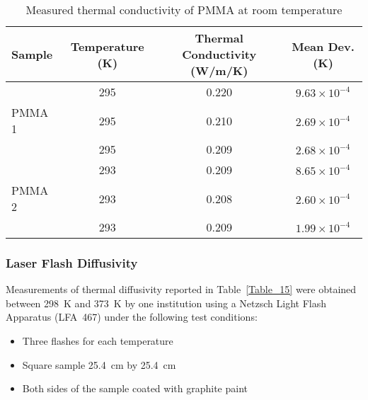 \documentclass{book}
\begin{document}
\begin{table}[ht]
\caption{Measured thermal conductivity of PMMA at room temperature}
\label{Table_14}
\begin{center}
\begin{tabular}{|l|ccc|}
\hline
Sample    & Temperature (K) & Thermal Conductivity (W/m/K) & Mean Dev. (K)        \\ \hline
          & 295             & 0.220                        & $9.63\times10^{-4}$  \\
PMMA 1    & 295             & 0.210                        & $2.69\times10^{-4}$  \\
          & 295             & 0.209                        & $2.68\times10^{-4}$  \\ \hline & 293             & 0.209                        & $8.65\times10^{-4}$  \\
PMMA 2    & 293             & 0.208                        & $2.60\times10^{-4}$  \\
          & 293             & 0.209                        & $1.99\times10^{-4}$  \\ \hline
\end{tabular}
\end{center}
\end{table}


\subsubsection{Laser Flash Diffusivity}

Measurements of thermal diffusivity reported in Table~\ref{Table_15} were obtained between 298~K and 373~K by one institution using a Netzsch Light Flash Apparatus (LFA~467) under the following test conditions: %
\begin{itemize}
 \item Three flashes for each temperature
 \item Square sample 25.4~cm by 25.4~cm
 \item Both sides of the sample coated with graphite paint
\end{itemize}
\end{document}

